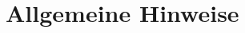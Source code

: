 \documentclass[
  name=\assignment,
  start=\releasedate,
  end=\duedate,
  subject=\lecture\,--\,\semester,
  group=\group,
  url=\url,
  author=\authors
]{assignment}
\begin{document}
\section*{Allgemeine Hinweise}

\end{document}
